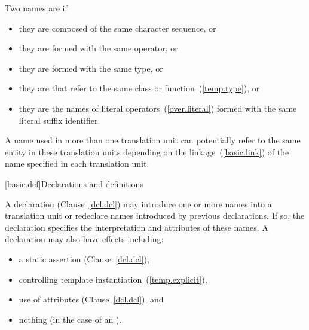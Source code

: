 \pnum
Two names are  if

\begin{itemize}
\item they are  composed of the same character sequence, or
\item they are  formed with
the same operator, or
\item they are  formed
with the same type, or
\item they are  that refer to the same class or function~(\ref{temp.type}), or
\item they are the names of literal operators~(\ref{over.literal}) formed with
the same literal suffix identifier.
\end{itemize}

\pnum
{}%
%
A name used in more than one translation unit can potentially
refer to the same entity in these translation units depending on the
linkage~(\ref{basic.link}) of the name specified in each
translation unit.

[basic.def]{Declarations and definitions}

\pnum
{}%
%
%
A declaration (Clause~\ref{dcl.dcl}) may introduce
one or more names into a translation
unit or redeclare names introduced by previous declarations.
If so, the
declaration specifies the interpretation and attributes of these names.
A declaration may also have effects including:

\begin{itemize}
\item a static assertion (Clause~\ref{dcl.dcl}),
\item controlling template instantiation~(\ref{temp.explicit}),
\item use of attributes (Clause~\ref{dcl.dcl}), and
\item nothing (in the case of an ).
\end{itemize}

